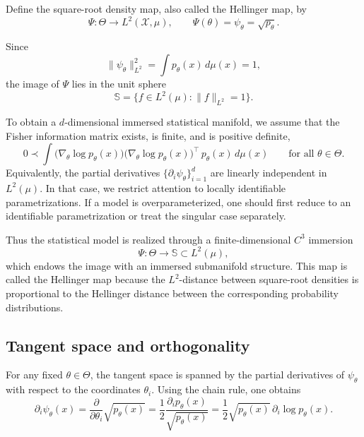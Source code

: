 \documentclass[11pt,letterpaper]{amsart}
\numberwithin{equation}{section}
\theoremstyle{plain}
\theoremstyle{definition}
\theoremstyle{remark}
\begin{document}
Define the square-root density map, also called the Hellinger map, by
\begin{equation*}
\Psi:\Theta\to L^2(\mathcal X,\mu),
\qquad
\Psi(\theta)=\psi_\theta=\sqrt{p_\theta}.
\end{equation*}

Since
\begin{equation*}
\|\psi_\theta\|_{L^2}^2=\int p_\theta(x)\,d\mu(x)=1,
\end{equation*}
the image of \(\Psi\) lies in the unit sphere
\begin{equation*}
\mathbb S=\{f\in L^2(\mu):\|f\|_{L^2}=1\}.
\end{equation*}

To obtain a \(d\)-dimensional immersed statistical manifold, we assume that the Fisher information matrix exists, is finite, and is positive definite,
\begin{equation*}
0\prec
\int
\big(\nabla_\theta\log p_\theta(x)\big)
\big(\nabla_\theta\log p_\theta(x)\big)^\top
\,p_\theta(x)\,d\mu(x)
\qquad\text{for all }\theta\in\Theta.
\end{equation*}
Equivalently, the partial derivatives \(\{\partial_i\psi_\theta\}_{i=1}^d\) are linearly independent in \(L^2(\mu)\). In that case, we restrict attention to locally identifiable parametrizations. If a model is overparameterized, one should first reduce to an identifiable parametrization or treat the singular case separately.

Thus the statistical model is realized through a finite-dimensional \(C^3\) immersion
\[
\Psi:\Theta\to \mathbb S\subset L^2(\mu),
\]
which endows the image with an immersed submanifold structure. This map is called the Hellinger map because the \(L^2\)-distance between square-root densities is proportional to the Hellinger distance between the corresponding probability distributions.

\subsection{Tangent space and orthogonality}

For any fixed \(\theta\in\Theta\), the tangent space is spanned by the partial derivatives of \(\psi_\theta\) with respect to the coordinates \(\theta_i\). Using the chain rule, one obtains
\begin{equation*}
\partial_i\psi_\theta(x)
=
\frac{\partial}{\partial\theta_i}\sqrt{p_\theta(x)}
=
\frac{1}{2}\frac{\partial_i p_\theta(x)}{\sqrt{p_\theta(x)}}
=
\frac{1}{2}\sqrt{p_\theta(x)}\,\partial_i\log p_\theta(x).
\end{equation*}
\end{document}

